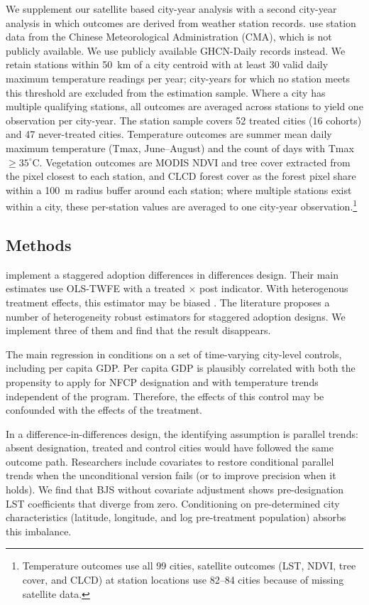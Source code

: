 \documentclass[12pt]{article}
\begin{document}
We supplement our satellite based city-year analysis with a second city-year analysis in which outcomes are derived from weather station records.  \citet{Ma2026} use station data from the Chinese Meteorological Administration (CMA), which is not publicly available.  We use publicly available GHCN-Daily records \citep{Menne2012} instead.  We retain stations within 50~km of a city centroid with at least 30 valid daily maximum temperature readings per year; city-years for which no station meets this threshold are excluded from the estimation sample.  Where a city has multiple qualifying stations, all outcomes are averaged across stations to yield one observation per city-year.  The station sample covers 52 treated cities (16 cohorts) and 47 never-treated cities.  Temperature outcomes are summer mean daily maximum temperature (Tmax, June--August) and the count of days with Tmax $\geq 35^\circ$C.  Vegetation outcomes are MODIS NDVI and tree cover extracted from the pixel closest to each station, and CLCD forest cover as the forest pixel share within a 100~m radius buffer around each station; where multiple stations exist within a city, these per-station values are averaged to one city-year observation.\footnote{Temperature outcomes use all 99 cities, satellite outcomes (LST, NDVI, tree cover, and CLCD) at station locations use 82--84 cities because of missing satellite data.}

\subsection*{Methods}

\citet{Ma2026} implement a staggered adoption differences in differences design. Their main estimates use OLS-TWFE with a treated $\times$ post indicator.  With heterogenous treatment effects, this estimator may be biased \citep{GoodmanBacon2021}. The literature proposes a number of heterogeneity robust estimators for staggered adoption designs.  We implement three of them and find that the \citet{Ma2026} result disappears.

The main regression in \citet{Ma2026} conditions on a set of time-varying city-level controls, including per capita GDP.  Per
capita GDP is plausibly correlated with both the propensity to apply for NFCP
designation and with temperature trends independent of the program. Therefore, the effects of this control may be confounded with the effects of the treatment.

In a difference-in-differences design, the identifying assumption is parallel
trends: absent designation, treated and control cities would have followed the same outcome path.  Researchers include covariates to restore conditional parallel trends when the unconditional version fails (or to improve precision when it holds). We find that BJS without covariate adjustment shows pre-designation LST coefficients that diverge from zero.
Conditioning on pre-determined city characteristics (latitude, longitude, and
log pre-treatment population) absorbs this imbalance.
\end{document}
